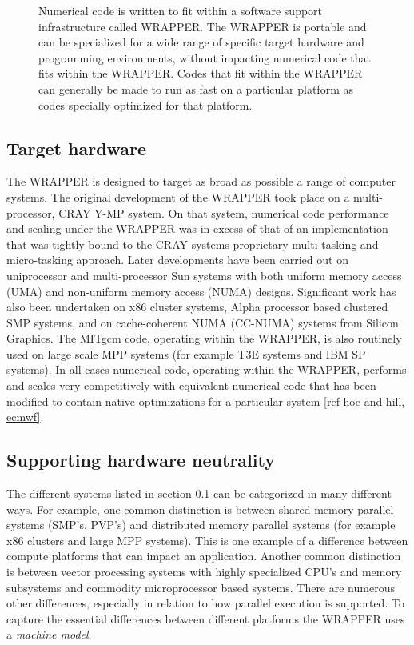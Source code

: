 \begin{figure}
\begin{center}
\end{center}
\caption{
Numerical code is written to fit within a software support
infrastructure called WRAPPER. The WRAPPER is portable and
can be specialized for a wide range of specific target hardware and 
programming environments, without impacting numerical code that fits
within the WRAPPER. Codes that fit within the WRAPPER can generally be
made to run as fast on a particular platform as codes specially 
optimized for that platform.}
\label{fig:fit_in_wrapper}
\end{figure}

\subsection{Target hardware}
\label{sect:target_hardware}

The WRAPPER is designed to target as broad as possible a range of computer
systems. The original development of the WRAPPER took place on a 
multi-processor, CRAY Y-MP system. On that system, numerical code performance 
and scaling under the WRAPPER was in excess of that of an implementation that 
was tightly bound to the CRAY systems proprietary multi-tasking and 
micro-tasking approach. Later developments have been carried out on 
uniprocessor and multi-processor Sun systems with both uniform memory access 
(UMA) and non-uniform memory access (NUMA) designs. Significant work has also 
been undertaken on x86 cluster systems, Alpha processor based clustered SMP 
systems, and on cache-coherent NUMA (CC-NUMA) systems from Silicon Graphics. 
The MITgcm code, operating within the WRAPPER, is also routinely used on 
large scale MPP systems (for example T3E systems and IBM SP systems). In all 
cases numerical code, operating within the WRAPPER, performs and scales very 
competitively with equivalent numerical code that has been modified to contain 
native optimizations for a particular system \ref{ref hoe and hill, ecmwf}.

\subsection{Supporting hardware neutrality}

The different systems listed in section \ref{sect:target_hardware} can be 
categorized in many different ways. For example, one common distinction is 
between shared-memory parallel systems (SMP's, PVP's) and distributed memory 
parallel systems (for example x86 clusters and large MPP systems). This is one 
example of a difference between compute platforms that can impact an 
application. Another common distinction is between vector processing systems 
with highly specialized CPU's and memory subsystems and commodity 
microprocessor based systems. There are numerous other differences, especially 
in relation to how parallel execution is supported. To capture the essential 
differences between different platforms the WRAPPER uses a {\it machine model}. 

